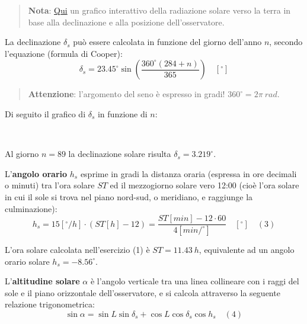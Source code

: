 \documentclass[11pt]{article}
\begin{document}
    \begin{quote}
\textbf{Nota}: \href{https://www.geogebra.org/m/BJxyY5Vz}{Qui} un
grafico interattivo della radiazione solare verso la terra in base alla
declinazione e alla posizione dell'osservatore.
\end{quote}

    La declinazione \(\delta_s\) può essere calcolata in funzione del giorno
dell'anno \(n\), secondo l'equazione (formula di Cooper):
\[\delta_s = 23.45^{{\circ}}\sin\left( \frac{360^{{\circ}}(284+n)}{365} \right) \quad [^{{\circ}}]\]

    \begin{quote}
\textbf{Attenzione}: l'argomento del seno è espresso in gradi!
\(360^{{\circ}}= 2\pi \ rad\).
\end{quote}

    Di seguito il grafico di \(\delta_s\) in funzione di \(n\):

    \begin{center}
    \end{center}
    { \hspace*{\fill} \\}
     
            
    
    Al giorno \(n=89\) la declinazione solare risulta
\(\delta_s=3.219^{\circ}\).

    

    L'\textbf{angolo orario} \(h_s\) esprime in gradi la distanza oraria
(espressa in ore decimali o minuti) tra l'ora solare \(ST\) ed il
mezzogiorno solare vero 12:00 (cioè l'ora solare in cui il sole si trova
nel piano nord-sud, o meridiano, e raggiunge la culminazione):
\[h_s = 15[^{{\circ}}/h]\cdot(ST[h]-12)=\frac{ST[min]-12\cdot60}{4[min/^{{\circ}}]} \quad [^{{\circ}}] \quad (3)\]
 
            
    
    L'ora solare calcolata nell'esercizio (1) è \(ST=11.43 \ h\),
equivalente ad un angolo orario solare \(h_s = -8.56^{\circ}\).

    

    L'\textbf{altitudine solare} \(\alpha\) è l'angolo verticale tra una
linea collineare con i raggi del sole e il piano orizzontale
dell'osservatore, e si calcola attraverso la seguente relazione
trigonometrica:
\[\sin \alpha=\sin L \sin \delta_s + \cos L \cos \delta_s \cos h_s \quad (4)\]
\end{document}
